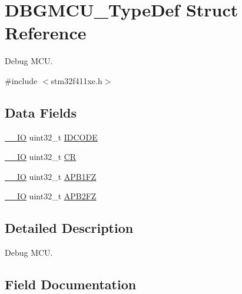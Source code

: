 \hypertarget{struct_d_b_g_m_c_u___type_def}{}\section{D\+B\+G\+M\+C\+U\+\_\+\+Type\+Def Struct Reference}
\label{struct_d_b_g_m_c_u___type_def}


Debug M\+CU.  




{\ttfamily \#include $<$stm32f411xe.\+h$>$}

\subsection*{Data Fields}
\begin{DoxyCompactItemize}
\item 
\hyperlink{core__sc300_8h_aec43007d9998a0a0e01faede4133d6be}{\+\_\+\+\_\+\+IO} uint32\+\_\+t \hyperlink{struct_d_b_g_m_c_u___type_def_a0cc3561c124d06bb57dfa855e43ed99f}{I\+D\+C\+O\+DE}
\item 
\hyperlink{core__sc300_8h_aec43007d9998a0a0e01faede4133d6be}{\+\_\+\+\_\+\+IO} uint32\+\_\+t \hyperlink{struct_d_b_g_m_c_u___type_def_a15981828f2b915d38570cf6684e99a53}{CR}
\item 
\hyperlink{core__sc300_8h_aec43007d9998a0a0e01faede4133d6be}{\+\_\+\+\_\+\+IO} uint32\+\_\+t \hyperlink{struct_d_b_g_m_c_u___type_def_aac341c7e09cd5224327eeb7d9f122bed}{A\+P\+B1\+FZ}
\item 
\hyperlink{core__sc300_8h_aec43007d9998a0a0e01faede4133d6be}{\+\_\+\+\_\+\+IO} uint32\+\_\+t \hyperlink{struct_d_b_g_m_c_u___type_def_a011f892d86367dbe786964b14bc515a6}{A\+P\+B2\+FZ}
\end{DoxyCompactItemize}


\subsection{Detailed Description}
Debug M\+CU. 

\subsection{Field Documentation}
\mbox{\label{struct_d_b_g_m_c_u___type_def_aac341c7e09cd5224327eeb7d9f122bed}} 
